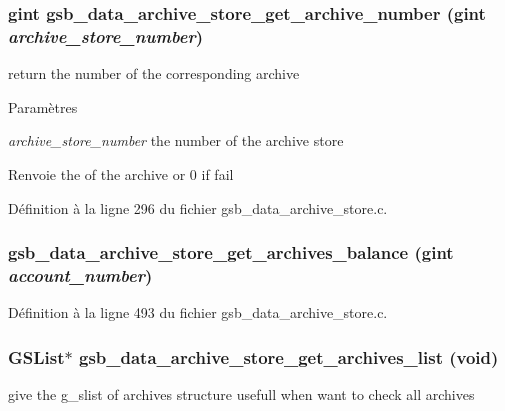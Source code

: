 \subsubsection[{gsb\_\-data\_\-archive\_\-store\_\-get\_\-archive\_\-number}]{\setlength{\rightskip}{0pt plus 5cm}gint gsb\_\-data\_\-archive\_\-store\_\-get\_\-archive\_\-number (gint {\em archive\_\-store\_\-number})}\label{gsb__data__archive__store_8c_aefc4123694ab2b13c39920917b045f18}
return the number of the corresponding archive


\begin{DoxyParams}{Paramètres}
\item[{\em archive\_\-store\_\-number}]the number of the archive store\end{DoxyParams}
\begin{DoxyReturn}{Renvoie}
the of the archive or 0 if fail 
\end{DoxyReturn}


Définition à la ligne 296 du fichier gsb\_\-data\_\-archive\_\-store.c.

\subsubsection[{gsb\_\-data\_\-archive\_\-store\_\-get\_\-archives\_\-balance}]{ gsb\_\-data\_\-archive\_\-store\_\-get\_\-archives\_\-balance (gint {\em account\_\-number})}\label{gsb__data__archive__store_8c_ac1dc6c9d5f8039ac88d633d3bcbd32a5}


Définition à la ligne 493 du fichier gsb\_\-data\_\-archive\_\-store.c.

\subsubsection[{gsb\_\-data\_\-archive\_\-store\_\-get\_\-archives\_\-list}]{\setlength{\rightskip}{0pt plus 5cm}GSList$\ast$ gsb\_\-data\_\-archive\_\-store\_\-get\_\-archives\_\-list (void)}\label{gsb__data__archive__store_8c_aaa582320ef1a27b7c506540b8f43df99}
give the g\_\-slist of archives structure usefull when want to check all archives


